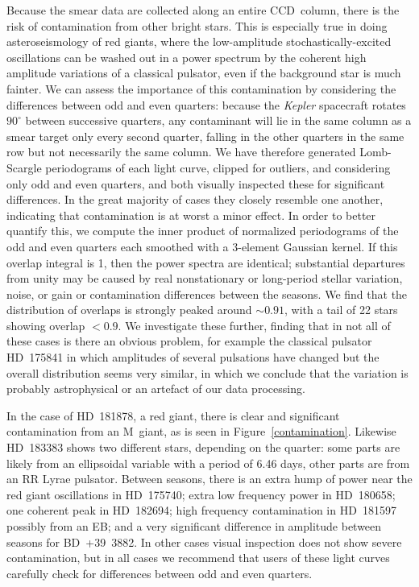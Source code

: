 \documentclass[a4paper,fleqn,usenatbib]{mnras}
\newcommand{\kepler}{\emph{Kepler}\xspace}
\begin{document}
Because the smear data are collected along an entire CCD~column, there is the risk of contamination from other bright stars. This is especially true in doing asteroseismology of red giants, where the low-amplitude stochastically-excited oscillations can be washed out in a power spectrum by the coherent high amplitude variations of a classical pulsator, even if the background star is much fainter. We can assess the importance of this contamination by considering the differences between odd and even quarters: because the \kepler spacecraft rotates $90^{\circ}$ between successive quarters, any contaminant will lie in the same column as a smear target only every second quarter, falling in the other quarters in the same row but not necessarily the same column. We have therefore generated Lomb-Scargle periodograms \citep{lomb,scargle} of each light curve, clipped for outliers, and considering only odd and even quarters, and both visually inspected these for significant differences. In the great majority of cases they closely resemble one another, indicating that contamination is at worst a minor effect. In order to better quantify this, we compute the inner product of  normalized periodograms of the odd and even quarters each smoothed with a 3-element Gaussian kernel. If this overlap integral is 1, then the power spectra are identical; substantial departures from unity may be caused by real nonstationary or long-period stellar variation, noise, or gain or contamination differences between the seasons. We find that the distribution of overlaps is strongly peaked around $\sim 0.91$, with a tail of 22 stars showing overlap $< 0.9$. We investigate these further, finding that in not all of these cases is there an obvious problem, for example the classical pulsator HD~175841 in which amplitudes of several pulsations have changed but the overall distribution seems very similar, in which we conclude that the variation is probably astrophysical or an artefact of our data processing. 

In the case of HD~181878, a red giant, there is clear and significant contamination from an M~giant, as is seen in Figure~\ref{contamination}. Likewise HD~183383 shows two different stars, depending on the quarter: some parts are likely from an ellipsoidal variable with a period of 6.46 days, other parts are from an RR Lyrae pulsator. Between seasons, there is an extra hump of power near the red giant oscillations in HD~175740; extra low frequency power in HD~180658; one coherent peak in  HD~182694; high frequency contamination in HD~181597 possibly from an EB; and a very significant difference in amplitude between seasons for BD~+39~3882. In other cases visual inspection does not show severe contamination, but in all cases we recommend that users of these light curves carefully check for differences between odd and even quarters.
\end{document}
